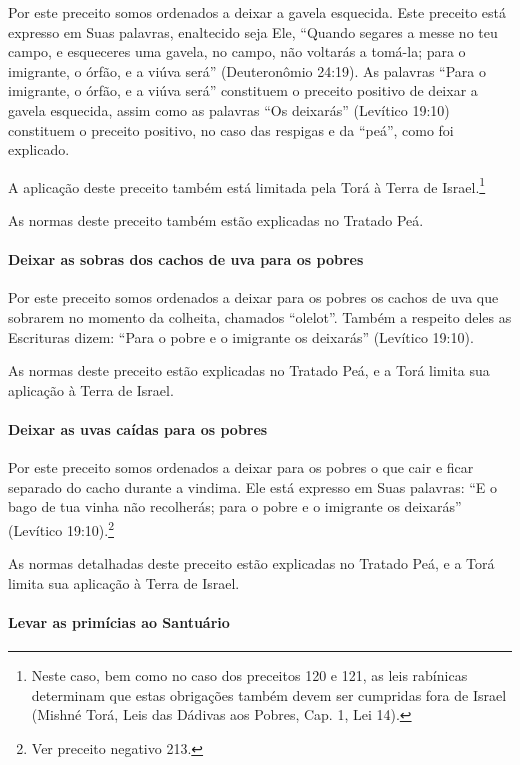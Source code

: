 Por este preceito somos ordenados a deixar a gavela esquecida. Este
preceito está expresso em Suas palavras, enaltecido seja Ele, ``Quando
segares a messe no teu campo, e esqueceres uma gavela, no campo, não
voltarás a tomá-la; para o imigrante, o órfão, e a viúva será''
(Deuteronômio 24:19). As palavras ``Para o imigrante, o órfão, e a viúva
será'' constituem o preceito positivo de
deixar a gavela esquecida, assim como as palavras ``Os deixarás''
(Levítico 19:10) constituem o preceito positivo, no caso das respigas e da ``peá'', como
foi explicado.

A aplicação deste preceito também está limitada pela Torá à Terra de Israel.\footnote{Neste caso, bem como no caso dos preceitos 120 e 121, as leis
  rabínicas determinam que estas obrigações também devem ser cumpridas
  fora de Israel (Mishné Torá, Leis das Dádivas aos Pobres, Cap. 1,
  Lei 14).}

As normas deste preceito também estão explicadas no Tratado Peá.

\paragraph{Deixar as sobras dos cachos de uva para os pobres}

Por este preceito somos ordenados a deixar para os pobres os cachos de
uva que sobrarem no momento da colheita, chamados ``olelot''. Também a
respeito deles as Escrituras dizem: ``Para o pobre e o imigrante os
deixarás'' (Levítico 19:10).

As normas deste preceito estão explicadas no Tratado Peá, e a Torá
limita sua aplicação à Terra de Israel.

\paragraph{Deixar as uvas caídas para os pobres}

Por este preceito somos ordenados a deixar para os pobres o que cair e
ficar separado do cacho durante a vindima. Ele está expresso em Suas
palavras: ``E o bago de tua vinha não recolherás; para o pobre e o
imigrante os deixarás'' (Levítico 19:10).\footnote{Ver preceito negativo 213.}

As normas detalhadas deste preceito estão explicadas no Tratado Peá, e a
Torá limita sua aplicação à Terra de Israel.

\paragraph{Levar as primícias ao Santuário}

